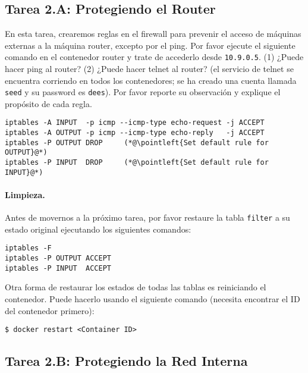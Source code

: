 \subsection{Tarea 2.A: Protegiendo el Router} 

En esta tarea, crearemos reglas en el firewall para prevenir el acceso de máquinas externas a la máquina router, excepto por el ping.
Por favor ejecute el siguiente comando \iptables en el contenedor router y trate de accederlo desde \texttt{10.9.0.5}. (1) ¿Puede hacer ping al router? (2) ¿Puede hacer telnet al router? (el servicio de telnet se encuentra corriendo en todos los contenedores; se ha creado una cuenta llamada \texttt{seed} y su password es \texttt{dees}).
Por favor reporte su observación y explique el propósito de cada regla.


\begin{lstlisting}
iptables -A INPUT  -p icmp --icmp-type echo-request -j ACCEPT
iptables -A OUTPUT -p icmp --icmp-type echo-reply   -j ACCEPT
iptables -P OUTPUT DROP     (*@\pointleft{Set default rule for OUTPUT}@*)
iptables -P INPUT  DROP     (*@\pointleft{Set default rule for INPUT}@*)
\end{lstlisting}
 

\paragraph{Limpieza.} 
Antes de movernos a la próximo tarea, por favor restaure la tabla \texttt{filter} a su estado original ejecutando los siguientes comandos:

\begin{lstlisting}
iptables -F
iptables -P OUTPUT ACCEPT
iptables -P INPUT  ACCEPT
\end{lstlisting}

Otra forma de restaurar los estados de todas las tablas es reiniciando el contenedor. Puede hacerlo usando el siguiente comando (necesita encontrar el ID del contenedor primero):

\begin{lstlisting}
$ docker restart <Container ID>
\end{lstlisting}
 


\subsection{Tarea 2.B: Protegiendo la Red Interna} 

